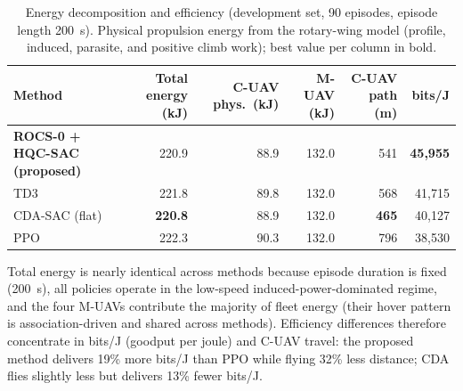 \begin{table}[t]
\centering
\caption{Energy decomposition and efficiency (development set, 90 episodes, episode length 200~s). Physical propulsion energy from the rotary-wing model (profile, induced, parasite, and positive climb work); best value per column in bold.}
\label{tab:energy}
\begin{tabular}{@{}lrrrrr@{}}
\toprule
Method & Total energy (kJ) & C-UAV phys.\ (kJ) & M-UAV (kJ) & C-UAV path (m) & bits/J \\
\midrule
\textbf{ROCS-0 + HQC-SAC (proposed)} & 220.9 & 88.9 & 132.0 & 541 & \textbf{45{,}955} \\
TD3 & 221.8 & 89.8 & 132.0 & 568 & 41{,}715 \\
CDA-SAC (flat) & \textbf{220.8} & 88.9 & 132.0 & \textbf{465} & 40{,}127 \\
PPO & 222.3 & 90.3 & 132.0 & 796 & 38{,}530 \\
\bottomrule
\end{tabular}
\begin{flushleft}\footnotesize
Total energy is nearly identical across methods because episode duration is fixed (200~s), all policies operate in the low-speed induced-power-dominated regime, and the four M-UAVs contribute the majority of fleet energy (their hover pattern is association-driven and shared across methods). Efficiency differences therefore concentrate in bits/J (goodput per joule) and C-UAV travel: the proposed method delivers 19\% more bits/J than PPO while flying 32\% less distance; CDA flies slightly less but delivers 13\% fewer bits/J.
\end{flushleft}
\end{table}
